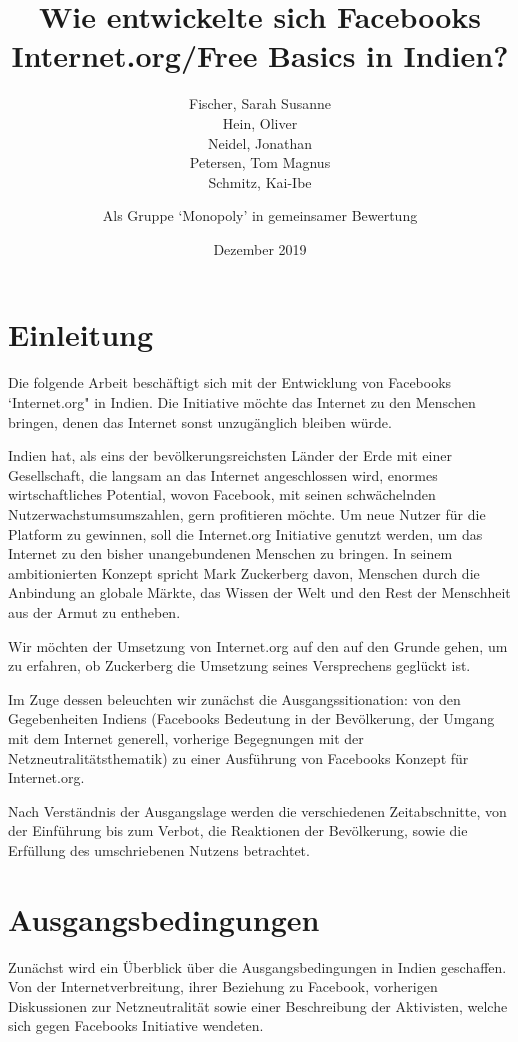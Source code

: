 \documentclass{article}
\title{Wie entwickelte sich Facebooks Internet.org/Free Basics in Indien?}
\author{
  Fischer, Sarah Susanne\\
  Hein, Oliver\\
  Neidel, Jonathan\\
  Petersen, Tom Magnus\\
  Schmitz, Kai-Ibe\\
  \and
  Als Gruppe `Monopoly' in gemeinsamer Bewertung
}
\date{Dezember 2019}
\begin{document}
\maketitle
\vfill

\section{Einleitung}

Die folgende Arbeit beschäftigt sich mit der Entwicklung von Facebooks `Internet.org" in Indien. Die Initiative möchte das Internet zu den Menschen bringen, denen das Internet sonst unzugänglich bleiben würde.

\medskip

Indien hat, als eins der bevölkerungsreichsten Länder der Erde mit einer Gesellschaft, die langsam an das Internet angeschlossen wird, enormes wirtschaftliches Potential,
wovon Facebook, mit seinen schwächelnden Nutzerwachstumsumszahlen, gern profitieren möchte.
Um neue Nutzer für die Platform zu gewinnen, soll die Internet.org Initiative genutzt werden, um das Internet zu den bisher unangebundenen Menschen zu bringen.
In seinem ambitionierten Konzept spricht Mark Zuckerberg davon, Menschen durch die Anbindung an globale Märkte, das Wissen der Welt und den Rest der Menschheit aus der Armut zu entheben.

\medskip

Wir möchten der Umsetzung von Internet.org auf den auf den Grunde gehen, um zu erfahren, ob Zuckerberg die Umsetzung seines Versprechens geglückt ist.

Im Zuge dessen beleuchten wir zunächst die Ausgangssitionation: von den Gegebenheiten Indiens (Facebooks Bedeutung in der Bevölkerung, der Umgang mit dem Internet generell, vorherige Begegnungen mit der Netzneutralitätsthematik) zu einer Ausführung von Facebooks Konzept für Internet.org.

Nach Verständnis der Ausgangslage werden die verschiedenen Zeitabschnitte, von der Einführung bis zum Verbot, die Reaktionen der Bevölkerung, sowie die Erfüllung des umschriebenen Nutzens betrachtet.

\break
\tableofcontents
\break

\section{Ausgangsbedingungen}

Zunächst wird ein Überblick über die Ausgangsbedingungen in Indien geschaffen. Von der Internetverbreitung, ihrer Beziehung zu Facebook, vorherigen Diskussionen zur Netzneutralität sowie einer Beschreibung der Aktivisten, welche sich gegen Facebooks Initiative wendeten.
\end{document}
